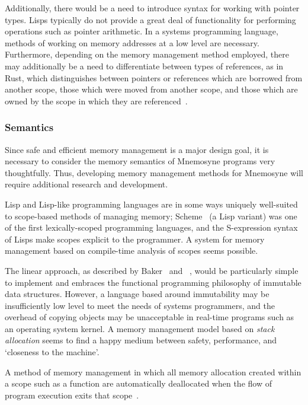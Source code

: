 Additionally, there would be a need to introduce syntax for working with pointer types. Lisps typically do not provide a great deal of functionality for performing operations such as pointer arithmetic. In a systems programming language, methods of working on memory addresses at a low level are necessary. Furthermore, depending on the memory management method employed, there may additionally be a need to differentiate between types of references, as in Rust, which distinguishes between pointers or references which are borrowed from another scope, those which were moved from another scope, and those which are owned by the scope in which they are referenced~\cite{Matsakis:2014:RL:2663171.2663188}.

\subsubsection{Semantics}

Since safe and efficient memory management is a major design goal, it is necessary to consider the memory semantics of Mnemosyne programs very thoughtfully. Thus, developing memory management methods for Mnemosyne will require additional research and development.

Lisp and Lisp-like programming languages are in some ways uniquely well-suited to scope-based methods of managing memory; Scheme~\cite{r6rs} (a Lisp variant) was one of the first lexically-scoped programming languages, and the S-expression syntax of Lisps make scopes explicit to the programmer. A system for memory management based on compile-time analysis of scopes seems possible.

The linear approach, as described by Baker~\cite{Baker:1992:LLL:142137.142162,Baker:1995:UVL:199818.199860} and \citeauthor{hawblitzel2004low}~\cite{hawblitzel2004low}, would be particularly simple to implement and embraces the functional programming philosophy of immutable data structures. However, a language based around immutability may be insufficiently low level to meet the needs of systems programmers, and the overhead of copying objects may be unacceptable in real-time programs such as an operating system kernel. A memory management model based on \textit{stack allocation} seems to find a happy medium between safety, performance, and `closeness to the machine'.

\begin{defn}
A method of memory management in which all memory allocation created within a scope such as a function are automatically deallocated when the flow of program execution exits that scope~\cite{Corry:2006:OSA:1133956.1133978,Hanson:1990:ESA:91556.91603}.
\end{defn}

